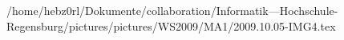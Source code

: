 /home/hebz0rl/Dokumente/collaboration/Informatik---Hochschule-Regensburg/pictures/pictures/WS2009/MA1/2009.10.05-IMG4.tex
